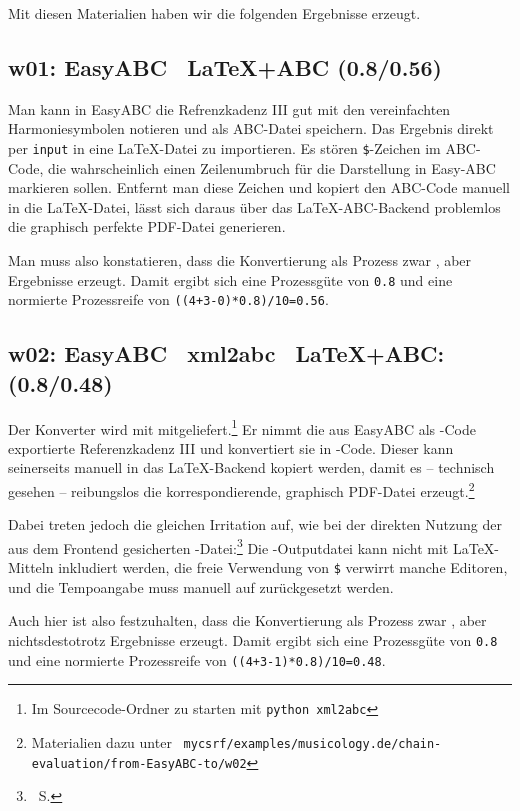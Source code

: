 Mit diesen Materialien haben wir die folgenden Ergebnisse erzeugt.

\subsection{w01: Easy\-ABC \ra\ \LaTeX+ABC (0.8/0.56)}\label{w01}

Man kann in Easy\-ABC die Refrenzkadenz III gut mit den vereinfachten
Harmoniesymbolen notieren und als ABC-Datei speichern. Das Ergebnis direkt per
\texttt{input} in eine \LaTeX-Datei zu importieren. Es stören
\texttt{\$}-Zeichen im ABC-Code, die wahrscheinlich einen Zeilenumbruch für die
Darstellung in Easy-ABC markieren sollen. Entfernt man diese Zeichen und kopiert
den ABC-Code manuell in die \LaTeX-Datei, lässt sich daraus über das
\LaTeX-ABC-Backend problemlos die graphisch perfekte PDF-Datei generieren.

Man muss also konstatieren, dass die Konvertierung als Prozess zwar
, aber  Ergebnisse erzeugt. Damit ergibt sich
eine Prozessgüte von \texttt{0.8} und eine normierte Prozessreife von
\texttt{((4+3-0)*0.8)/10=0.56}.

\subsection{w02: Easy\-ABC \ra\ xml2abc \ra\ \LaTeX+ABC: (0.8/0.48)}\label{w02}

Der Konverter  wird mit  mitgeliefert.\footnote{Im
Sourcecode-Ordner zu starten mit \texttt{python xml2abc}} Er nimmt die aus
Easy\-ABC als -Code exportierte Referenzkadenz III und konvertiert sie
in -Code. Dieser kann seinerseits manuell in das \LaTeX-Backend kopiert
werden, damit es -- technisch gesehen -- reibungslos die korrespondierende,
graphisch  PDF-Datei erzeugt.\footnote{Materialien dazu unter
\ra\
\texttt{mycsrf/examples/musicology.de/chain-evaluation/from-EasyABC-to/w02}}

Dabei treten jedoch die gleichen Irritation auf, wie bei der direkten Nutzung
der aus dem Frontend gesicherten \acc{abc}-Datei:\footnote{\ra\ S.\pageref{w01}}
Die \acc{ABC}-Outputdatei kann nicht mit \LaTeX-Mitteln inkludiert werden, die
freie Verwendung von \texttt{\$} verwirrt manche Editoren, und die Tempoangabe
muss manuell auf \texttt{\Acht=90} zurückgesetzt werden.

Auch hier ist also festzuhalten, dass die Konvertierung als Prozess zwar
\acc{stolpert}, aber nichtsdestotrotz \acc{exzellente} Ergebnisse erzeugt. Damit
ergibt sich eine Prozessgüte von \texttt{0.8} und eine normierte Prozessreife
von \texttt{((4+3-1)*0.8)/10=0.48}.


